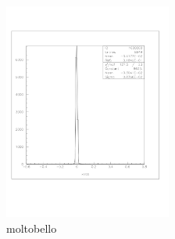 \documentclass[a4paper]{article}
\begin{document}
\begin{figure}[!htb]
  \includegraphics[width=0.49\textwidth]{ex_images/1_005_140_xs.jpg}
  \caption{moltobello}
  \label{fig:005_xs}
\end{figure}
\end{document}
